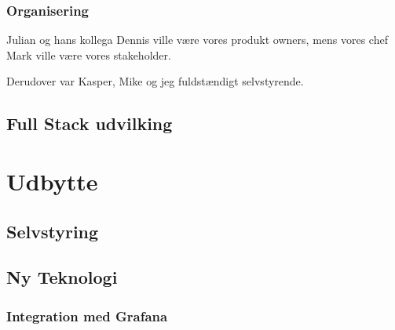 \documentclass[a4paper]{article}
\begin{document}
\subsubsection{Organisering}
Julian og hans kollega Dennis ville være vores produkt owners,
mens vores chef Mark ville være vores stakeholder.

Derudover var Kasper, Mike og jeg fuldstændigt selvstyrende.


\subsection{Full Stack udvilking}

\section{Udbytte}
\subsection{Selvstyring}
\subsection{Ny Teknologi}
\subsubsection{Integration med Grafana}
\end{document}
